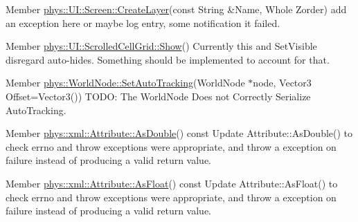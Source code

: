 \label{todo__todo000029}
\hypertarget{todo__todo000029}{}
 
\begin{DoxyDescription}
\item[Member \hyperlink{classphys_1_1UI_1_1Screen_ad3b73f039f840fd2b2dc20219c428e9d}{phys::UI::Screen::CreateLayer}(const String \&Name, Whole Zorder) ]add an exception here or maybe log entry, some notification it failed. 
\end{DoxyDescription}

\label{todo__todo000030}
\hypertarget{todo__todo000030}{}
 
\begin{DoxyDescription}
\item[Member \hyperlink{classphys_1_1UI_1_1ScrolledCellGrid_af75c87ada3a1bac3dda208485ebc5f94}{phys::UI::ScrolledCellGrid::Show}() ]Currently this and SetVisible disregard auto-\/hides. Something should be implemented to account for that. 
\end{DoxyDescription}

\label{todo__todo000032}
\hypertarget{todo__todo000032}{}
 
\begin{DoxyDescription}
\item[Member \hyperlink{classphys_1_1WorldNode_a3c8447cd6de0af06a6004cdd968671f0}{phys::WorldNode::SetAutoTracking}(WorldNode $\ast$node, Vector3 Offset=Vector3()) ]TODO: The WorldNode Does not Correctly Serialize AutoTracking. 
\end{DoxyDescription}

\label{todo__todo000044}
\hypertarget{todo__todo000044}{}
 
\begin{DoxyDescription}
\item[Member \hyperlink{classphys_1_1xml_1_1Attribute_a467ae167d5407ae3293a22b8873cb43a}{phys::xml::Attribute::AsDouble}() const  ]Update Attribute::AsDouble() to check errno and throw exceptions were appropriate, and throw a exception on failure instead of producing a valid return value. 
\end{DoxyDescription}

\label{todo__todo000045}
\hypertarget{todo__todo000045}{}
 
\begin{DoxyDescription}
\item[Member \hyperlink{classphys_1_1xml_1_1Attribute_aad74f805b9318735011d698ee39113aa}{phys::xml::Attribute::AsFloat}() const  ]Update Attribute::AsFloat() to check errno and throw exceptions were appropriate, and throw a exception on failure instead of producing a valid return value. 
\end{DoxyDescription}

